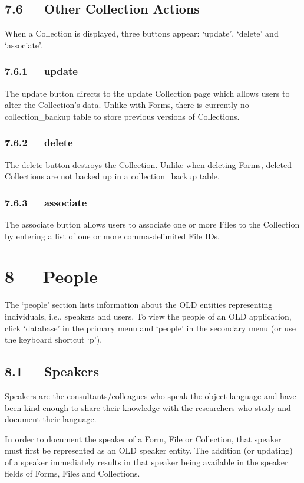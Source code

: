\documentclass[letterpaper,10pt,english]{sphinxmanual}
\begin{document}
\section{7.6   Other Collection Actions}
\label{user_guide:other-collection-actions}
When a Collection is displayed, three buttons appear: `update', `delete' and
`associate'.


\subsection{7.6.1   update}
\label{user_guide:id17}
The update button directs to the update Collection page which allows users to
alter the Collection's data.  Unlike with Forms, there is currently no
collection\_backup table to store previous versions of Collections.


\subsection{7.6.2   delete}
\label{user_guide:id18}
The delete button destroys the Collection.  Unlike when deleting Forms, deleted
Collections are not backed up in a collection\_backup table.


\subsection{7.6.3   associate}
\label{user_guide:id19}
The associate button allows users to associate one or more Files to the
Collection by entering a list of one or more comma-delimited File IDs.


\chapter{8   People}
\label{user_guide:people}
The `people' section lists information about the OLD entities representing
individuals, i.e., speakers and users.  To view the people of an OLD
application, click `database' in the primary menu and `people' in the secondary
menu (or use the keyboard shortcut `p').


\section{8.1   Speakers}
\label{user_guide:speakers}
Speakers are the consultants/colleagues who speak the object language and have
been kind enough to share their knowledge with the researchers who study and
document their language.

In order to document the speaker of a Form, File or Collection, that speaker
must first be represented as an OLD speaker entity.  The addition (or updating)
of a speaker immediately results in that speaker being available in the speaker
fields of Forms, Files and Collections.
\end{document}

